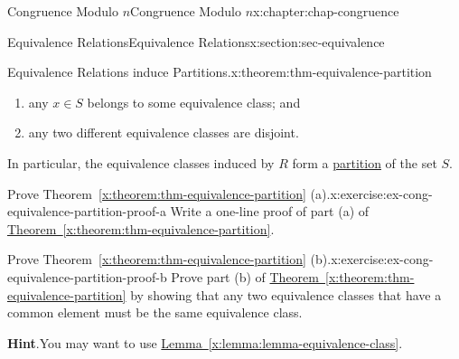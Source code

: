 \documentclass[oneside,10pt,]{book}
\newcommand{\blocktitlefont}{\relax}
\newcommand{\xreffont}{\relax}
\numberwithin{equation}{section}
\newlength{\qrsize}
\newlength{\previewwidth}
\begin{document}
\begin{chapterptx}{Congruence Modulo \(n\)}{}{Congruence Modulo \(n\)}{}{}{x:chapter:chap-congruence}
\begin{sectionptx}{Equivalence Relations}{}{Equivalence Relations}{}{}{x:section:sec-equivalence}
\begin{theorem}{Equivalence Relations induce Partitions.}{}{x:theorem:thm-equivalence-partition}
\begin{enumerate}[label=(\alph*)]
\item{}any \(x \in S\) belongs to some equivalence class; and%
\item{}any two different equivalence classes are disjoint.%
\end{enumerate}
In particular, the equivalence classes induced by \(R\) form a \hyperref[x:definition:def-partition]{partition} of the set \(S\).%
\end{theorem}
\begin{inlineexercise}{Prove Theorem~{\xreffont\ref*{x:theorem:thm-equivalence-partition}} (a).}{x:exercise:ex-cong-equivalence-partition-proof-a}%
Write a one-line proof of part (a) of \hyperref[x:theorem:thm-equivalence-partition]{Theorem~{\xreffont\ref{x:theorem:thm-equivalence-partition}}}.%
\end{inlineexercise}%
\begin{inlineexercise}{Prove Theorem~{\xreffont\ref*{x:theorem:thm-equivalence-partition}} (b).}{x:exercise:ex-cong-equivalence-partition-proof-b}%
Prove part (b) of \hyperref[x:theorem:thm-equivalence-partition]{Theorem~{\xreffont\ref{x:theorem:thm-equivalence-partition}}} by showing that any two equivalence classes that have a common element must be the same equivalence class.%
\par\smallskip%
\noindent\textbf{\blocktitlefont Hint}.\hypertarget{g:hint:id537251}{}\quad{}You may want to use \hyperref[x:lemma:lemma-equivalence-class]{Lemma~{\xreffont\ref{x:lemma:lemma-equivalence-class}}}.%
\end{inlineexercise}%
\begin{sidebyside}{1}{0}{0}{0}%
\begin{sbspanel}{1}%
\setlength{\qrsize}{9em}
\setlength{\previewwidth}{\linewidth}
\addtolength{\previewwidth}{-\qrsize}
\begin{tcbraster}[raster columns=2, raster column skip=1pt, raster halign=center, raster force size=false, raster left skip=0pt, raster right skip=0pt]%
\begin{tcolorbox}[previewstyle, width=\previewwidth]%

\end{tcolorbox}
\end{tcbraster}
\end{sbspanel}
\end{sidebyside}
\end{sectionptx}
\end{chapterptx}
\end{document}
